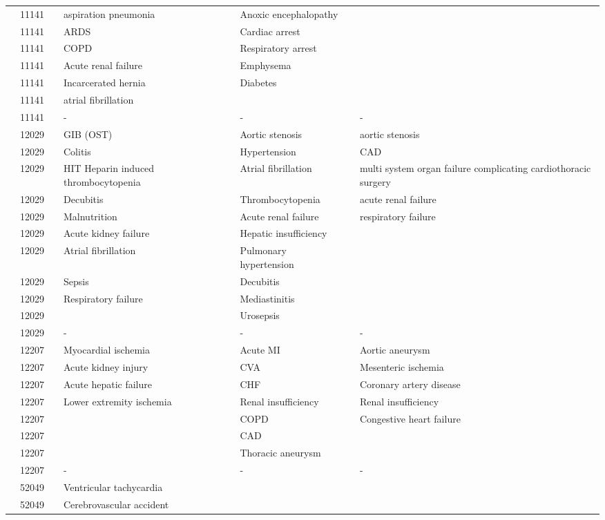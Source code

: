 \documentclass[dvips, 10pt]{article}
\begin{document}
\begin{table}[t]
\begin{center}
\begin{tabular}{ @{}l@{}
@{}l@{}@{}p{1.5em}@{}@{}p{1.75in}@{}@{}p{1.5em}@{}@{}p{1.75in}@{}@{}p{1.5em}@{}@{}p{1.75in}@{}
}
\\
& 11141 && aspiration pneumonia && Anoxic encephalopathy &&  \\
& 11141 && ARDS && Cardiac arrest &&  \\
& 11141 && COPD && Respiratory arrest &&  \\
& 11141 && Acute renal failure && Emphysema &&  \\
& 11141 && Incarcerated hernia && Diabetes &&  \\
& 11141 && atrial fibrillation &&  &&  \\
& 11141 && - && - && - \\
& 12029 && GIB (OST) && Aortic stenosis && aortic stenosis \\
& 12029 && Colitis && Hypertension && CAD \\
& 12029 && HIT Heparin induced thrombocytopenia && Atrial fibrillation && multi system organ failure complicating cardiothoracic surgery \\
& 12029 && Decubitis && Thrombocytopenia && acute renal failure \\
& 12029 && Malnutrition && Acute renal failure && respiratory failure \\
& 12029 && Acute kidney failure && Hepatic insufficiency &&  \\
& 12029 && Atrial fibrillation && Pulmonary hypertension &&  \\
& 12029 && Sepsis && Decubitis &&  \\
& 12029 && Respiratory failure && Mediastinitis &&  \\
& 12029 &&  && Urosepsis &&  \\
& 12029 && - && - && - \\
& 12207 && Myocardial ischemia && Acute MI && Aortic aneurysm \\
& 12207 && Acute kidney injury && CVA && Mesenteric ischemia \\
& 12207 && Acute hepatic failure && CHF && Coronary artery disease \\
& 12207 && Lower extremity ischemia && Renal insufficiency && Renal insufficiency \\
& 12207 &&  && COPD && Congestive heart failure \\
& 12207 &&  && CAD &&  \\
& 12207 &&  && Thoracic aneurysm &&  \\
& 12207 && - && - && - \\
& 52049 && Ventricular tachycardia &&  &&  \\
& 52049 && Cerebrovascular accident &&  &&  \\

\end{tabular}
\end{center}
\end{table}
\end{document}
